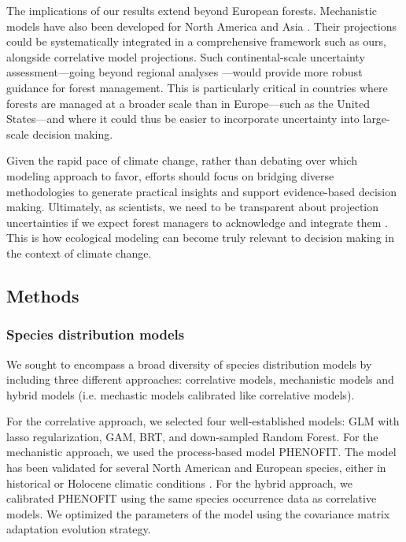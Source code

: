\documentclass[11pt,letter]{article}
\begin{document}
The implications of our results extend beyond European forests. Mechanistic models have also been developed for North America and Asia \citep{Morin2007, Fang2022}. Their projections could be systematically integrated in a comprehensive framework such as ours, alongside correlative model projections. Such continental-scale uncertainty assessment---going beyond regional analyses \citep{Iverson2016}---would provide more robust guidance for forest management. This is particularly critical in countries where forests are managed at a broader scale than in Europe---such as the United States---and where it could thus be easier to incorporate uncertainty into large-scale decision making. 

Given the rapid pace of climate change, rather than debating over which modeling approach to favor, efforts should focus on bridging diverse methodologies to generate practical insights and support evidence-based decision making. Ultimately, as scientists, we need to be transparent about projection uncertainties if we expect forest managers to acknowledge and integrate them \citep{Saltelli2020}. This is how ecological modeling can become truly relevant to decision making in the context of climate change.


\subsection*{Methods}

\subsubsection*{Species distribution models}

We sought to encompass a broad diversity of species distribution models by including three different approaches: correlative models, mechanistic models and hybrid models (i.e. mechastic models calibrated like correlative models\citep{VanderMeersch2023}).

For the correlative approach, we selected four well-established models\citep{Valavi2022}: GLM with lasso regularization, GAM, BRT, and down-sampled Random Forest. For the mechanistic approach, we used the process-based model PHENOFIT. The model has been validated for several North American and European species, either in historical or Holocene climatic conditions \citep{Morin2007, Saltre2013, Duputie2015, Gauzere2020, VanderMeersch2025}. For the hybrid approach, we calibrated PHENOFIT using the same species occurrence data as correlative models\citep{VanderMeersch2023}. We optimized the parameters of the model using the covariance matrix adaptation evolution strategy\citep{Hansen2001}.
\end{document}
